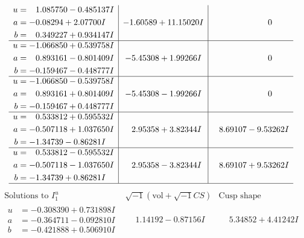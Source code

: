 \documentclass[1p]{elsarticle_modified}
\theoremstyle{definition}
\newcommand{\I}{\sqrt{-1}}
\begin{document}
$$\begin{array}{c|c|c}
\begin{aligned}
u &= \phantom{-}1.085750 - 0.485137 I \\
a &= -0.08294 + 2.07700 I \\
b &= \phantom{-}0.349227 + 0.934147 I\end{aligned}
 & -1.60589 + 11.15020 I & \phantom{-0.000000 } 0 \\ \hline\begin{aligned}
u &= -1.066850 + 0.539758 I \\
a &= \phantom{-}0.893161 - 0.801409 I \\
b &= -0.159467 - 0.448777 I\end{aligned}
 & -5.45308 + 1.99266 I & \phantom{-0.000000 } 0 \\ \hline\begin{aligned}
u &= -1.066850 - 0.539758 I \\
a &= \phantom{-}0.893161 + 0.801409 I \\
b &= -0.159467 + 0.448777 I\end{aligned}
 & -5.45308 - 1.99266 I & \phantom{-0.000000 } 0 \\ \hline\begin{aligned}
u &= \phantom{-}0.533812 + 0.595532 I \\
a &= -0.507118 + 1.037650 I \\
b &= -1.34739 - 0.86281 I\end{aligned}
 & \phantom{-}2.95358 + 3.82344 I & \phantom{-}8.69107 - 9.53262 I \\ \hline\begin{aligned}
u &= \phantom{-}0.533812 - 0.595532 I \\
a &= -0.507118 - 1.037650 I \\
b &= -1.34739 + 0.86281 I\end{aligned}
 & \phantom{-}2.95358 - 3.82344 I & \phantom{-}8.69107 + 9.53262 I\\
 \hline 
 \end{array}$$\newpage$$\begin{array}{c|c|c}  
\text{Solutions to }I^u_{1}& \I (\text{vol} + \sqrt{-1}CS) & \text{Cusp shape}\\
 \hline 
\begin{aligned}
u &= -0.308390 + 0.731898 I \\
a &= -0.364711 - 0.092810 I \\
b &= -0.421888 + 0.506910 I\end{aligned}
 & \phantom{-}1.14192 - 0.87156 I & \phantom{-}5.34852 + 4.41242 I \\ \hline\begin{aligned}

\end{aligned}
\end{array}$$
\end{document}

